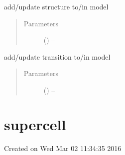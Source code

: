 \documentclass[letterpaper,10pt,english]{sphinxmanual}
\begin{document}
\begin{fulllineitems}
\begin{fulllineitems}
\begin{quote}
\begin{description}
\end{description}\end{quote}

\end{fulllineitems}


\begin{fulllineitems}
\label{\detokenize{rst/structure:mstack.structure.Phase.update_structures}}
add/update structure to/in model
\begin{quote}\begin{description}
\item[{Parameters}] \leavevmode
{} (\sphinxstyleliteralemphasis{*}) -- 

\end{description}\end{quote}

\end{fulllineitems}


\begin{fulllineitems}
\label{\detokenize{rst/structure:mstack.structure.Phase.update_transitions}}
add/update transition to/in model
\begin{quote}\begin{description}
\item[{Parameters}] \leavevmode
{} ({\hyperref[\detokenize{rst/transition:mstack.transition.Transitions}]{}}) -- 

\end{description}\end{quote}

\end{fulllineitems}


\end{fulllineitems}



\section{supercell}
\label{\detokenize{rst/supercell:supercell}}\label{\detokenize{rst/supercell:module-mstack.supercell}}\label{\detokenize{rst/supercell::doc}}
Created on Wed Mar 02 11:34:35 2016
\end{document}
